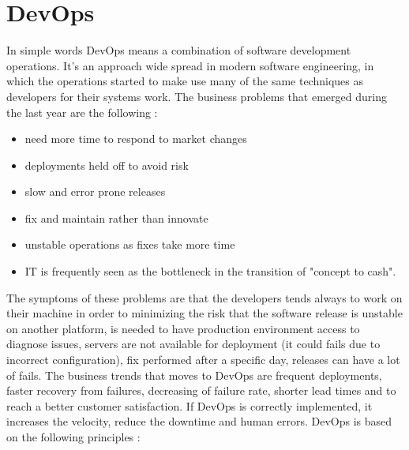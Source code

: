 \documentclass[11pt]{article}
\begin{document}
\section{DevOps}
In simple words DevOps means a combination of software development operations. It's an approach wide spread in modern software engineering, in which the operations started to make use many of the same techniques as developers for their systems work. The business problems that emerged during the last year are the following : 
\begin{itemize}
\item need more time to respond to market changes
\item deployments held off to avoid risk
\item slow and error prone releases
\item fix and maintain rather than innovate
\item unstable operations as fixes take more time
\item IT is frequently seen as the bottleneck in the transition of "concept to cash".
\end{itemize}
The symptoms of these problems are that the developers tends always to work on their machine in order to minimizing the risk that the software release is unstable on another platform, is needed to have production environment access to diagnose issues, servers are not available for deployment (it could fails due to incorrect configuration), fix performed after a specific day, releases can have a lot of fails. The business trends that moves to DevOps are frequent deployments, faster recovery from failures, decreasing of failure rate, shorter lead times and to reach a better customer satisfaction. If DevOps is correctly implemented, it increases the velocity, reduce the downtime and human errors. DevOps is based on the following principles :
\end{document}
